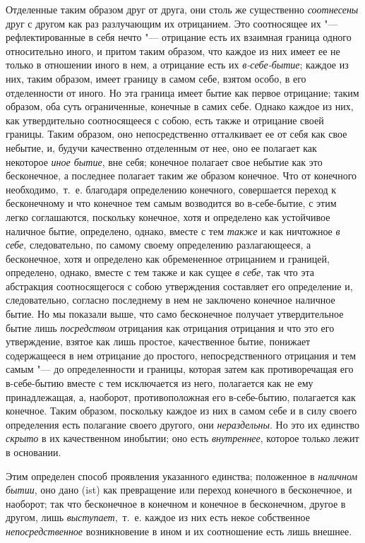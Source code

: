 Отделенные таким образом друг от друга, они столь же существенно
{\em соотнесены} друг с другом как раз разлучающим их
отрицанием. Это соотносящее их "--- рефлектированные в себя нечто "--- отрицание
есть их взаимная граница одного относительно иного, и притом таким
образом, что каждое из них имеет ее не только в отношении иного в нем, а
отрицание есть их {\em в-себе-бытие}; каждое из них,
таким образом, имеет границу в самом себе, взятом особо, в его отделенности
от иного. Но эта граница имеет бытие как первое отрицание; таким образом,
оба суть ограниченные, конечные в самих себе. Однако каждое из них, как
утвердительно соотносящееся с собою, есть также и отрицание своей границы.
Таким образом, оно непосредственно отталкивает ее от себя как свое небытие,
и, будучи качественно отделенным от нее, оно ее полагает как некоторое
{\em иное бытие}, вне себя; конечное полагает свое
небытие как это бесконечное, а последнее полагает таким же образом
конечное. Что от конечного необходимо,~т.~е. благодаря определению
конечного, совершается переход к бесконечному и что конечное тем самым
возводится во в-себе-бытие, с этим легко соглашаются, поскольку конечное,
хотя и определено как устойчивое наличное бытие, определено, однако, вместе
с тем {\em также} и как ничтожное
{\em в себе}, следовательно, по самому своему
определению разлагающееся, а бесконечное, хотя и определено как
обремененное отрицанием и границей, определено, однако, вместе с тем также
и как сущее {\em в себе}, так что эта абстракция
соотносящегося с собою утверждения составляет его определение и,
следовательно, согласно последнему в нем не заключено конечное наличное
бытие. Но мы показали выше, что само бесконечное получает утвердительное
бытие лишь {\em посредством} отрицания как отрицания
отрицания и что это его утверждение, взятое как лишь простое, качественное
бытие, понижает содержащееся в нем отрицание до простого, непосредственного
отрицания и тем самым "--- до определенности и границы, которая затем как
противоречащая его в-себе-бытию вместе с тем исключается из него,
полагается как не ему принадлежащая, а, наоборот, противоположная его
в-себе-бытию, полагается как конечное. Таким образом, поскольку каждое из
них в самом себе и в силу своего определения есть полагание своего другого,
они {\em нераздельны}. Но это их единство
{\em скрыто} в их качественном инобытии; оно есть
{\em внутреннее}, которое только лежит в основании.

Этим определен способ проявления указанного единства; положенное в
{\em наличном бытии}, оно дано (ist) как превращение
или переход конечного в бесконечное, и наоборот; так что бесконечное в
конечном и конечное в бесконечном, другое в другом, лишь
{\em выступает},~т.~е. каждое из них есть некое
собственное {\em непосредственное} возникновение в
ином и их соотношение есть лишь внешнее.

